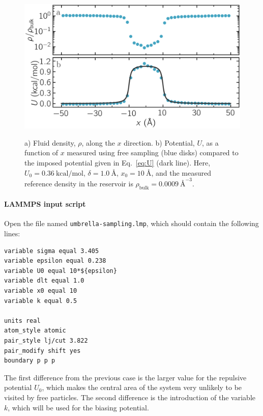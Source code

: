 \documentclass[9pt,tutorial]{livecoms}
\newcommand{\flecmd}[1]{\textcolor{command}{\texttt{#1}}} %
\begin{document}
\begin{figure}
\centering
\includegraphics[width=\linewidth]{US-density}\\[-2ex]
\caption{a) Fluid density, $\rho$, along the $x$ direction.
b) Potential, $U$, as a function of $x$ measured using free sampling (blue disks)
compared to the imposed potential given in Eq.~\eqref{eq:U} (dark line).
Here, $U_0 = 0.36~\text{kcal/mol}$, $\delta = 1.0~\text{\AA{}}$, $x_0 = 10~\text{\AA{}}$,
and the measured reference density in the reservoir is $\rho_\text{bulk} = 0.0009~\text{\AA{}}^{-3}$.} %
\label{fig:US-density}
\end{figure}

\paragraph{LAMMPS input script}

Open the file named \flecmd{umbrella-sampling.lmp}, which should
contain the following lines:
\begin{lstlisting}
variable sigma equal 3.405
variable epsilon equal 0.238
variable U0 equal 10*${epsilon}
variable dlt equal 1.0
variable x0 equal 10
variable k equal 0.5

units real
atom_style atomic
pair_style lj/cut 3.822
pair_modify shift yes
boundary p p p
\end{lstlisting}
The first difference from the previous case is the larger value
for the repulsive potential $U_0$, which makes the central area
of the system very unlikely to be visited by free particles.  The second
difference is the introduction of the variable $k$, which will be used for
the biasing potential.
\end{document}
